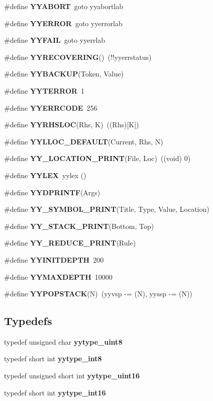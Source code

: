 \begin{CompactItemize}
\#define {\bf YYABORT}~goto yyabortlab
\item 
\#define {\bf YYERROR}~goto yyerrorlab
\item 
\#define {\bf YYFAIL}~goto yyerrlab
\item 
\#define {\bf YYRECOVERING}()~(!!yyerrstatus)
\item 
\#define {\bf YYBACKUP}(Token, Value)
\item 
\#define {\bf YYTERROR}~1
\item 
\#define {\bf YYERRCODE}~256
\item 
\#define {\bf YYRHSLOC}(Rhs, K)~((Rhs)[K])
\item 
\#define {\bf YYLLOC\_\-DEFAULT}(Current, Rhs, N)
\item 
\#define {\bf YY\_\-LOCATION\_\-PRINT}(File, Loc)~((void) 0)
\item 
\#define {\bf YYLEX}~yylex ()
\item 
\#define {\bf YYDPRINTF}(Args)
\item 
\#define {\bf YY\_\-SYMBOL\_\-PRINT}(Title, Type, Value, Location)
\item 
\#define {\bf YY\_\-STACK\_\-PRINT}(Bottom, Top)
\item 
\#define {\bf YY\_\-REDUCE\_\-PRINT}(Rule)
\item 
\#define {\bf YYINITDEPTH}~200
\item 
\#define {\bf YYMAXDEPTH}~10000
\item 
\#define {\bf YYPOPSTACK}(N)~(yyvsp -= (N), yyssp -= (N))
\end{CompactItemize}
\subsection*{Typedefs}
\begin{CompactItemize}
\item 
typedef unsigned char {\bf yytype\_\-uint8}
\item 
typedef short int {\bf yytype\_\-int8}
\item 
typedef unsigned short int {\bf yytype\_\-uint16}
\item 
typedef short int {\bf yytype\_\-int16}
\end{CompactItemize}
